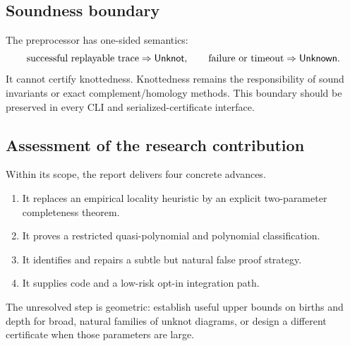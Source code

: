 \subsection{Soundness boundary}

The preprocessor has one-sided semantics:
\[
  \text{successful replayable trace}\Rightarrow\mathsf{Unknot},
  \qquad
  \text{failure or timeout}\Rightarrow\mathsf{Unknown}.
\]
It cannot certify knottedness.  Knottedness remains the responsibility of sound
invariants or exact complement/homology methods.  This boundary should be
preserved in every CLI and serialized-certificate interface.

\subsection{Assessment of the research contribution}

Within its scope, the report delivers four concrete advances.
\begin{enumerate}
\item It replaces an empirical locality heuristic by an explicit two-parameter
      completeness theorem.
\item It proves a restricted quasi-polynomial and polynomial classification.
\item It identifies and repairs a subtle but natural false proof strategy.
\item It supplies code and a low-risk opt-in integration path.
\end{enumerate}
The unresolved step is geometric: establish useful upper bounds on births and
depth for broad, natural families of unknot diagrams, or design a different
certificate when those parameters are large.
